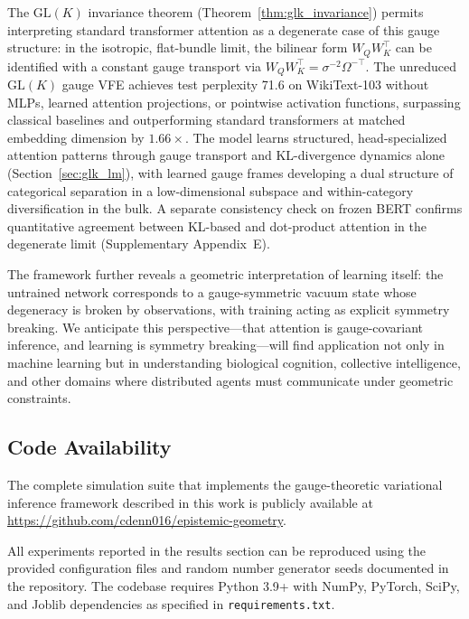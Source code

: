 \documentclass[twoside,11pt]{article}
\begin{document}
The $\mathrm{GL}(K)$ invariance theorem (Theorem~\ref{thm:glk_invariance}) permits interpreting standard transformer attention as a degenerate case of this gauge structure: in the isotropic, flat-bundle limit, the bilinear form $W_Q W_K^\top$ can be identified with a constant gauge transport via $W_Q W_K^\top = \sigma^{-2}\Omega^{-\top}$. The unreduced $\mathrm{GL}(K)$ gauge VFE achieves test perplexity 71.6 on WikiText-103 without MLPs, learned attention projections, or pointwise activation functions, surpassing classical baselines and outperforming standard transformers at matched embedding dimension by $1.66\times$. The model learns structured, head-specialized attention patterns through gauge transport and KL-divergence dynamics alone (Section~\ref{sec:glk_lm}), with learned gauge frames developing a dual structure of categorical separation in a low-dimensional subspace and within-category diversification in the bulk. A separate consistency check on frozen BERT confirms quantitative agreement between KL-based and dot-product attention in the degenerate limit (Supplementary Appendix~E).

The framework further reveals a geometric interpretation of learning itself: the untrained network corresponds to a gauge-symmetric vacuum state whose degeneracy is broken by observations, with training acting as explicit symmetry breaking. We anticipate this perspective---that attention is gauge-covariant inference, and learning is symmetry breaking---will find application not only in machine learning but in understanding biological cognition, collective intelligence, and other domains where distributed agents must communicate under geometric constraints.


\subsection{Code Availability}
The complete simulation suite that implements the gauge-theoretic variational inference framework described in this work is publicly available at \href{https://github.com/cdenn016/epistemic-geometry}{https://github.com/cdenn016/epistemic-geometry}.


All experiments reported in the results section can be reproduced using the provided configuration files and random number generator seeds documented in the repository. The codebase requires Python 3.9+ with NumPy, PyTorch, SciPy, and Joblib dependencies as specified in \texttt{requirements.txt}.
\end{document}
